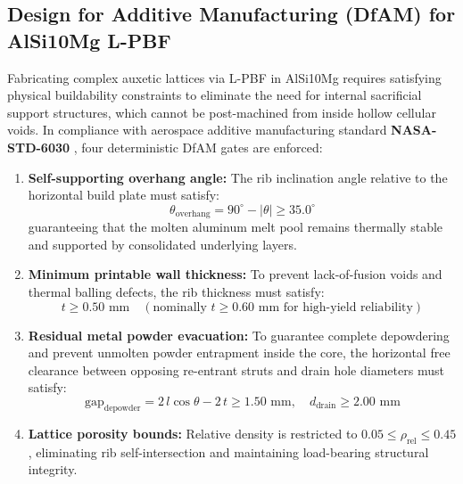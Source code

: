 \documentclass[preprint,12pt,3p]{elsarticle}
\begin{document}
\subsection{Design for Additive Manufacturing (DfAM) for AlSi10Mg L-PBF}
Fabricating complex auxetic lattices via L-PBF in AlSi10Mg requires satisfying physical buildability constraints to eliminate the need for internal sacrificial support structures, which cannot be post-machined from inside hollow cellular voids. In compliance with aerospace additive manufacturing standard \textbf{NASA-STD-6030} \cite{nasa2021}, four deterministic DfAM gates are enforced:
\begin{enumerate}
  \item \textbf{Self-supporting overhang angle:} The rib inclination angle relative to the horizontal build plate must satisfy:
  \begin{equation}
    \theta_{\text{overhang}} = 90^\circ - |\theta| \ge 35.0^\circ
  \end{equation}
  guaranteeing that the molten aluminum melt pool remains thermally stable and supported by consolidated underlying layers.
  \item \textbf{Minimum printable wall thickness:} To prevent lack-of-fusion voids and thermal balling defects, the rib thickness must satisfy:
  \begin{equation}
    t \ge 0.50\text{ mm} \quad (\text{nominally } t \ge 0.60\text{ mm for high-yield reliability})
  \end{equation}
  \item \textbf{Residual metal powder evacuation:} To guarantee complete depowdering and prevent unmolten powder entrapment inside the core, the horizontal free clearance between opposing re-entrant struts and drain hole diameters must satisfy:
  \begin{equation}
    \text{gap}_{\text{depowder}} = 2\,l\cos\theta - 2\,t \ge 1.50\text{ mm}, \quad d_{\text{drain}} \ge 2.00\text{ mm}
  \end{equation}
  \item \textbf{Lattice porosity bounds:} Relative density is restricted to $0.05 \le \rho_{\text{rel}} \le 0.45$, eliminating rib self-intersection and maintaining load-bearing structural integrity.
\end{enumerate}
\end{document}
